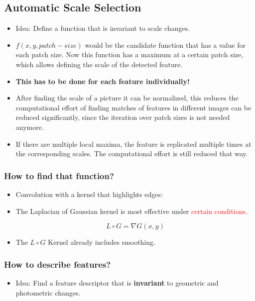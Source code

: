 \documentclass[10pt,a4paper]{scrartcl}
\begin{document}
\begin{multicols*}{2}
\subsection{Automatic Scale Selection}

\begin{itemize}
\item Idea: Define a function that is invariant to scale changes.
\item $f(x,y,patch-size)$ would be the candidate function that has a value for each patch size. Now this function has a maximum at a certain patch size, which allows defining the scale of the detected feature.
\item \textbf{This has to be done for each feature individually!}
\item After finding the scale of a picture it can be normalized, this reduces the computational effort of finding matches of features in different images can be reduced significantly, since the iteration over patch sizes is not needed anymore.
\item If there are multiple local maxima, the feature is replicated multiple times at the corresponding scales. The computational effort is still reduced that way.
\end{itemize}

\subsubsection{How to find that function?}

\begin{itemize}
\item Convolution with a kernel that highlights edges:

\item The Laplacian of Gaussian kernel is most effective under \textcolor{red}{certain conditions}.

\begin{equation*}
L\circ G=\nabla G(x,y)
\end{equation*}
\item The $L\circ G$ Kernel already includes smoothing.
\end{itemize}

\subsubsection{How to describe features?}

\begin{itemize}
\item Idea: Find a feature descriptor that is \textbf{invariant} to geometric and photometric changes.
\end{itemize}


\end{multicols*}
\end{document}
